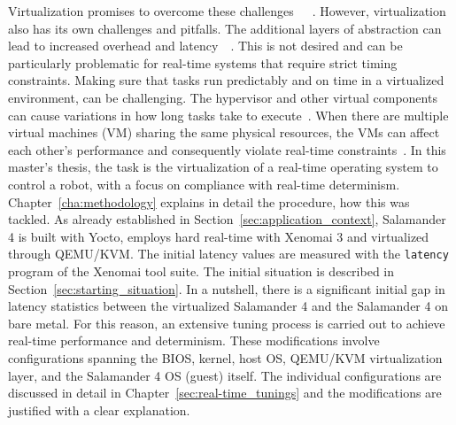 \documentclass[MMR,Master,english]{twbook}
\begin{document}
\bigskip \noindent Virtualization promises to overcome these challenges~\cite{queirozContainerbasedVirtualizationRealtime2024}~\cite{bhardwajVirtualizationCloudComputing2021}~\cite{cinqueEvaluatingVirtualizationFog2023}. However, virtualization also has its own challenges and pitfalls. The additional layers of abstraction can lead to increased overhead and latency~\cite{casiniLatencyAnalysisVirtualization2021}~\cite{zhangEvaluatingOptimizingVirtualization2010}. This is not desired and can be particularly problematic for real-time systems that require strict timing constraints. Making sure that tasks run predictably and on time in a virtualized environment, can be challenging. The hypervisor and other virtual components can cause variations in how long tasks take to execute~\cite{garcia-vallsChallengesRealtimeVirtualization2014}. When there are multiple virtual machines (VM) sharing the same physical resources, the VMs can affect each other's performance and consequently violate real-time constraints~\cite{queirozContainerbasedVirtualizationRealtime2024}.
\clearpage
\bigskip \noindent In this master's thesis, the task is the virtualization of a real-time operating system to control a robot, with a focus on compliance with real-time determinism. Chapter~\ref{cha:methodology} explains in detail the procedure, how this was tackled.  As already established in Section~\ref{sec:application_context}, Salamander 4 is built with Yocto, employs hard real-time with Xenomai 3 and virtualized through QEMU/KVM. The initial latency values are measured with the \texttt{latency} program of the Xenomai tool suite. The initial situation is described in Section~\ref{sec:starting_situation}. In a nutshell, there is a significant initial gap in latency statistics between the virtualized Salamander 4 and the Salamander 4 on bare metal. For this reason, an extensive tuning process is carried out to achieve real-time performance and determinism. These modifications involve configurations spanning the BIOS, kernel, host OS, QEMU/KVM virtualization layer, and the Salamander 4 OS (guest) itself. The individual configurations are discussed in detail in Chapter~\ref{sec:real-time_tunings} and the modifications are justified with a clear explanation.
\end{document}
